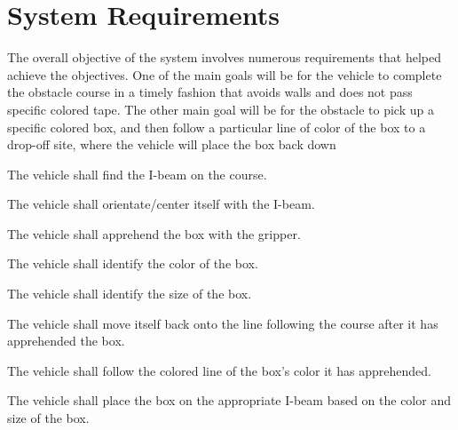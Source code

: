 \documentclass[11pt]{report}
\begin{document}
\chapter{System Requirements}\label{ch:system-requirements}

The overall objective of the system involves numerous requirements that helped achieve the objectives. One of the main goals will be for the vehicle to complete the obstacle course in a timely fashion that avoids walls and does not pass specific colored tape. The other main goal will be for the obstacle to pick up a specific colored box, and then follow a particular line of color of the box to a drop-off site, where the vehicle will place the box back down

\label{sc:box-pick-up-and-placement-system}
\begin{greylineformat}
\vspace{-1.6em}
\label{sub:recognition-of-the-i-beam}
The vehicle shall find the I-beam on the course.

\label{sub:orientation-of-the-i-beam}
The vehicle shall orientate/center itself with the I-beam.

\label{sub:apprehend-the-box}
The vehicle shall apprehend the box with the gripper.

\label{sub:identify-the-color-of-the-box}
The vehicle shall identify the color of the box.

\label{sub:identify-the-size-of-the-box}
The vehicle shall identify the size of the box. 

\label{sub:realign-with-the-line-following-course}
The vehicle shall move itself back onto the line following the course after it has apprehended the box.

\label{sub:follow-the-line-of-the-color-of-the-box-and-return}
The vehicle shall follow the colored line of the box’s color it has apprehended.

\label{sub:placement-of-the-box}
The vehicle shall place the box on the appropriate I-beam based on the color and size of the box.
\end{greylineformat}
\end{document}
